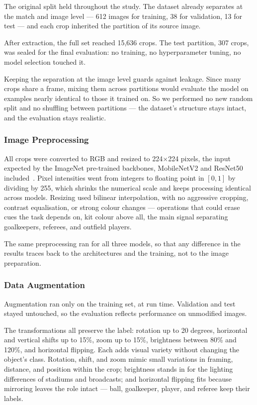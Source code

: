 \documentclass[preprint,12pt]{elsarticle}
\begin{document}
The original split held throughout the study. The dataset already separates at the match and image level --- 612 images for training, 38 for validation, 13 for test --- and each crop inherited the partition of its source image.

After extraction, the full set reached 15,636 crops. The test partition, 307 crops, was sealed for the final evaluation: no training, no hyperparameter tuning, no model selection touched it.

Keeping the separation at the image level guards against leakage. Since many crops share a frame, mixing them across partitions would evaluate the model on examples nearly identical to those it trained on. So we performed no new random split and no shuffling between partitions --- the dataset's structure stays intact, and the evaluation stays realistic.

\subsubsection{Image Preprocessing}

All crops were converted to RGB and resized to 224$\times$224 pixels, the input expected by the ImageNet pre-trained backbones, MobileNetV2 and ResNet50 included~\cite{sandler2018mobilenetv2,he2016deep}. Pixel intensities went from integers to floating point in $[0,1]$ by dividing by 255, which shrinks the numerical scale and keeps processing identical across models. Resizing used bilinear interpolation, with no aggressive cropping, contrast equalisation, or strong colour changes --- operations that could erase cues the task depends on, kit colour above all, the main signal separating goalkeepers, referees, and outfield players.

The same preprocessing ran for all three models, so that any difference in the results traces back to the architectures and the training, not to the image preparation.

\subsubsection{Data Augmentation}

Augmentation ran only on the training set, at run time. Validation and test stayed untouched, so the evaluation reflects performance on unmodified images.

The transformations all preserve the label: rotation up to 20 degrees, horizontal and vertical shifts up to 15\%, zoom up to 15\%, brightness between 80\% and 120\%, and horizontal flipping. Each adds visual variety without changing the object's class. Rotation, shift, and zoom mimic small variations in framing, distance, and position within the crop; brightness stands in for the lighting differences of stadiums and broadcasts; and horizontal flipping fits because mirroring leaves the role intact --- ball, goalkeeper, player, and referee keep their labels.
\end{document}
